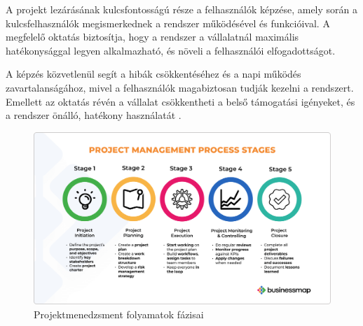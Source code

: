 A projekt lezárásának kulcsfontosságú része a felhasználók képzése, amely során a kulcsfelhasználók megismerkednek a rendszer működésével és funkcióival.  
A megfelelő oktatás biztosítja, hogy a rendszer a vállalatnál maximális hatékonysággal legyen alkalmazható, és növeli a felhasználói elfogadottságot.  

A képzés közvetlenül segít a hibák csökkentéséhez és a napi működés zavartalanságához, mivel a felhasználók magabiztosan tudják kezelni a rendszert.  
Emellett az oktatás révén a vállalat csökkentheti a belső támogatási igényeket, és a rendszer önálló, hatékony használatát \cite{Szalay2018,Kovacs2016}.

\begin{figure}[H]
    \centering
    \includegraphics[width=130mm, keepaspectratio]{figures/project_management_process_stages.png}
    \caption{Projektmenedzsment folyamatok fázisai}
    \label{fig:project_management_process_stages}
\end{figure}
